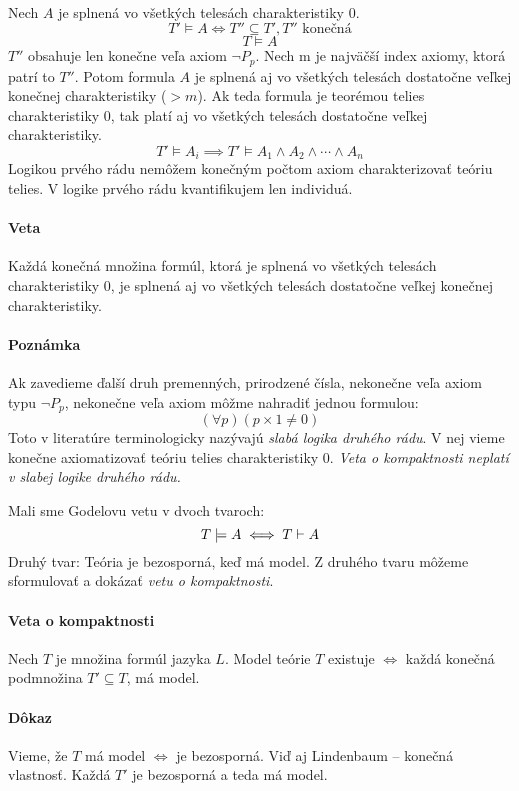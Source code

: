 \paragraph{}
Nech $A$ je splnená vo všetkých telesách charakteristiky 0.
 $$ T' \models A \iff T'' \subseteq T', T''\mbox{ konečná} $$
 $$ T \models A $$
$T''$ obsahuje len konečne veľa axiom $\neg P_p$. Nech m je najväčší index
axiomy, ktorá patrí to $T''$. Potom formula $A$ je splnená aj vo všetkých telesách dostatočne
veľkej konečnej charakteristiky ($>m$). Ak teda formula je teorémou telies
charakteristiky $0$, tak platí aj vo všetkých telesách dostatočne veľkej charakteristiky.
$$ T' \models A_i \implies T' \models A_1 \land A_2 \land \cdots \land A_n $$
Logikou prvého rádu nemôžem konečným počtom axiom charakterizovať teóriu telies.
V logike prvého rádu kvantifikujem len individuá.

\paragraph{Veta}
Každá konečná množina formúl, ktorá je splnená vo všetkých telesách charakteristiky 0,
je splnená aj vo všetkých telesách dostatočne veľkej konečnej charakteristiky.

\paragraph{Poznámka}
Ak zavedieme ďalší druh premenných, prirodzené čísla, nekonečne veľa axiom
typu $\neg P_p$, nekonečne veľa axiom môžme nahradiť jednou formulou:
$$ (\forall p)(p\times 1\not=0)$$
Toto v literatúre terminologicky nazývajú \emph{slabá logika druhého rádu}. V nej
vieme konečne axiomatizovať teóriu telies charakteristiky 0.
\emph{Veta o kompaktnosti neplatí v slabej logike druhého rádu.}

Mali sme Godelovu vetu v dvoch tvaroch:
$$ T \models A \iff T \vdash A$$
Druhý tvar: Teória je bezosporná, keď má model. Z druhého tvaru môžeme sformulovať a dokázať
\emph{vetu o kompaktnosti}.

\paragraph{Veta o kompaktnosti}
Nech $T$ je množina formúl jazyka $L$. Model teórie $T$ existuje $\iff$ každá konečná podmnožina
$T' \subseteq T$, má model.

\paragraph{Dôkaz}
Vieme, že $T$ má model $\iff$ je bezosporná. Viď aj Lindenbaum -- konečná vlastnosť.
Každá $T'$ je bezosporná a teda má model.

